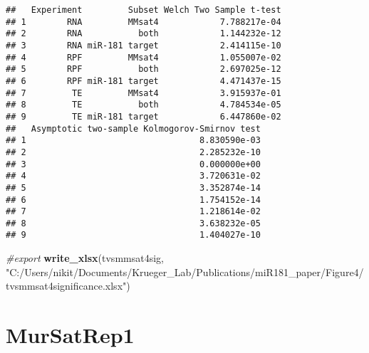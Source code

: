 \documentclass[
]{article}
\newenvironment{Shaded}{\begin{snugshade}}{\end{snugshade}}
\newcommand{\CommentTok}[1]{\textcolor[rgb]{0.56,0.35,0.01}{\textit{#1}}}
\newcommand{\FunctionTok}[1]{\textcolor[rgb]{0.13,0.29,0.53}{\textbf{#1}}}
\newcommand{\NormalTok}[1]{#1}
\newcommand{\StringTok}[1]{\textcolor[rgb]{0.31,0.60,0.02}{#1}}
\begin{document}
\begin{verbatim}
##   Experiment         Subset Welch Two Sample t-test
## 1        RNA         MMsat4            7.788217e-04
## 2        RNA           both            1.144232e-12
## 3        RNA miR-181 target            2.414115e-10
## 4        RPF         MMsat4            1.055007e-02
## 5        RPF           both            2.697025e-12
## 6        RPF miR-181 target            4.471437e-15
## 7         TE         MMsat4            3.915937e-01
## 8         TE           both            4.784534e-05
## 9         TE miR-181 target            6.447860e-02
##   Asymptotic two-sample Kolmogorov-Smirnov test
## 1                                  8.830590e-03
## 2                                  2.285232e-10
## 3                                  0.000000e+00
## 4                                  3.720631e-02
## 5                                  3.352874e-14
## 6                                  1.754152e-14
## 7                                  1.218614e-02
## 8                                  3.638232e-05
## 9                                  1.404027e-10
\end{verbatim}

\begin{Shaded}
\begin{Highlighting}[]
\CommentTok{\#export}
\FunctionTok{write\_xlsx}\NormalTok{(tvsmmsat4sig, }\StringTok{"C:/Users/nikit/Documents/Krueger\_Lab/Publications/miR181\_paper/Figure4/tvsmmsat4significance.xlsx"}\NormalTok{)}
\end{Highlighting}
\end{Shaded}

\hypertarget{mursatrep1}{%
\section{MurSatRep1}\label{mursatrep1}}
\end{document}
